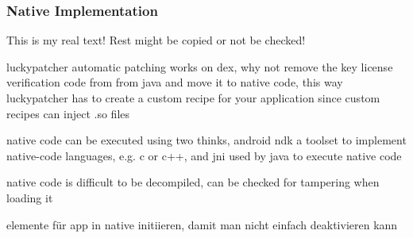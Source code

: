 \subsubsection{Native Implementation} \label{subsubsection:counter-modifications-dynamic}
This is my real text! Rest might be copied or not be checked!

luckypatcher automatic patching works on dex, why not remove the key license verification code from from java and move it to native code, this way luckypatcher has to create a custom recipe for your application since custom recipes can inject .so files

native code can be executed using two thinks, android ndk a toolset to implement native-code languages, e.g. c or c++, and  \gls{jni} used by java to execute native code

native code is difficult to be decompiled, can be checked for tampering when loading it


elemente für app in native initiieren, damit man nicht einfach deaktivieren kann
